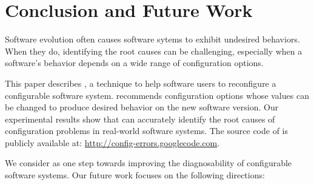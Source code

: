\section{Conclusion and Future Work}
\label{sec:conclusion}

Software evolution often causes software sytems to
exhibit undesired behaviors.
When they do, identifying the root causes
can be challenging, especially when a software's
behavior depends on a wide range of configuration options.

This paper describes \ourtool, a technique to help software
users to reconfigure a configurable software system. \ourtool
recommends configuration options whose values can be changed to
produce desired behavior on the new software version.
Our experimental results show that \ourtool
can accurately identify the root causes of
\errornum configuration problems in \subjnum real-world software systems.
The source code of \ourtool is publicly available
at: \url{http://config-errors.googlecode.com}.

We consider \ourtool as one step towards improving
the diagnosability of configurable software systems.
Our future work focuses on the following directions:

\vspace{-2mm}

